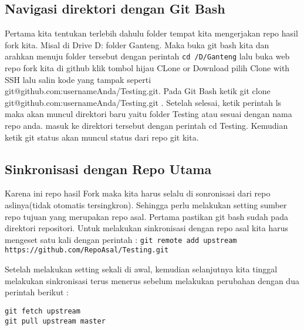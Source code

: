 \subsection{Navigasi direktori dengan Git Bash}
Pertama kita tentukan terlebih dahulu folder tempat kita mengerjakan repo hasil fork kita. Misal di Drive D: folder Ganteng. Maka buka git bash kita dan arahkan menuju folder tersebut dengan perintah \verb|cd /D/Ganteng| lalu buka web repo fork kita di github klik tombol hijau CLone or Download pilih Clone with SSH lalu salin kode yang tampak seperti git@github.com:usernameAnda/Testing.git. Pada Git Bash ketik git clone git@github.com:usernameAnda/Testing.git . Setelah selesai, ketik perintah ls maka akan muncul direktori baru yaitu folder Testing atau sesuai dengan nama repo anda. masuk ke direktori tersebut dengan perintah cd Testing. Kemudian ketik git status akan muncul status dari repo git kita.

\subsection{Sinkronisasi dengan Repo Utama}
Karena ini repo hasil Fork maka kita harus selalu di sonronisasi dari repo aslinya(tidak otomatis tersingkron). Sehingga perlu melakukan setting sumber repo tujuan yang merupakan repo asal. Pertama pastikan git bash sudah pada direktori repositori. Untuk melakukan sinkronisasi dengan repo asal kita harus mengeset satu kali dengan perintah :
\verb|git remote add upstream https://github.com/RepoAsal/Testing.git|

Setelah melakukan setting sekali di awal, kemudian selanjutnya kita tinggal melakukan sinkronisasi terus menerus sebelum melakukan perubahan dengan dua perintah berikut :
\begin{verbatim}
git fetch upstream
git pull upstream master
\end{verbatim}


